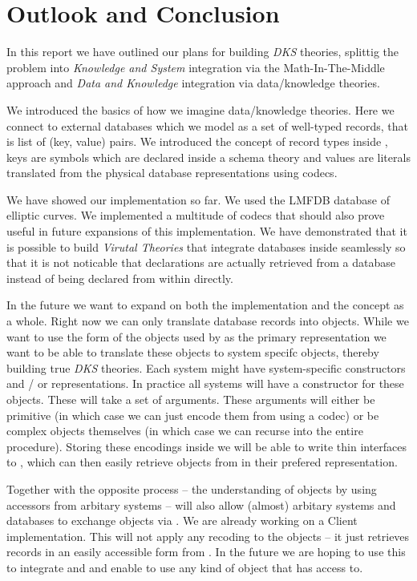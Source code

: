 \section{Outlook and Conclusion}\label{sec:conclusion}

In this report we have outlined our plans for building \textit{DKS} theories, splittig the
problem into \textit{Knowledge and System} integration via the Math-In-The-Middle approach and
\textit{Data and Knowledge} integration via data/knowledge theories.


We introduced the basics of how we imagine \MMT data/knowledge theories. Here we connect to
external databases which we model as a set of well-typed records, that is list of (key, value)
pairs. We introduced the concept of record types inside \MMT, keys are symbols which are
declared inside a schema theory and values are \MMT literals translated from the physical
database representations using codecs.

We have showed our implementation so far. We used the LMFDB database of elliptic curves. We
implemented a multitude of codecs that should also prove useful in future expansions of this
implementation. We have demonstrated that it is possible to build \textit{Virutal Theories}
that integrate databases inside \MMT seamlessly so that it is not noticable that declarations
are actually retrieved from a database instead of being declared from within \MMT directly.

In the future we want to expand on both the implementation and the concept as a whole. Right
now we can only translate database records into \MMT objects. While we want to use the form of
the objects used by \MMT as the primary representation we want to be able to translate these
objects to system specifc objects, thereby building true \textit{DKS} theories. Each system
might have system-specific constructors and / or representations. In practice all systems will
have a constructor for these objects. These will take a set of arguments. These arguments will
either be primitive (in which case we can just encode them from \MMT using a codec) or be
complex objects themselves (in which case we can recurse into the entire procedure). Storing
these encodings inside \MMT we will be able to write thin interfaces to \MMT, which can then
easily retrieve objects from \MMT in their prefered representation.

Together with the opposite process -- the understanding of objects by using accessors from
arbitary systems -- will also allow (almost) arbitary systems and databases to exchange objects
via \MMT. We are already working on a \python Client implementation. This will not apply any
recoding to the objects -- it just retrieves records in an easily accessible form from \MMT. In
the future we are hoping to use this to integrate \MMT and \GAP and enable \GAP to use any kind
of object that \MMT has access to.

